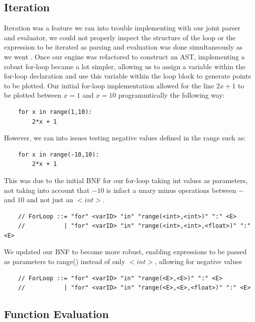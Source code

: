 \documentclass[a4paper, oneside, 11pt]{report}
\begin{document}
\subsection{Iteration}
Iteration was a feature we ran into trouble implementing with our joint parser and evaluator, we could not properly inspect the structure of the loop or the expression to be iterated as parsing and evaluation was done simultaneously as we went . Once our engine was refactored to construct an AST, implementing a robust for-loop became a lot simpler, allowing us to assign a variable within the for-loop declaration and use this variable within the loop block to generate points to be plotted. Our initial for-loop implementation allowed for the line $2x+1$ to be plotted between $x = 1$ and $x = 10$ programmtically the following way:

\begin{verbatim}
    for x in range(1,10):
        2*x + 1
\end{verbatim}

However, we ran into issues testing negative values defined in the range such as:

\begin{verbatim}
    for x in range(-10,10):
        2*x + 1
\end{verbatim}

This was due to the initial BNF for our for-loop taking int values as parameters, not taking into account that $-10$ is infact a unary minus operations between $-$ and $10$ and not just an $<int>$.

\begin{verbatim}
    // ForLoop ::= "for" <varID> "in" "range(<int>,<int>)" ":" <E>
    //           | "for" <varID> "in" "range(<int>,<int>,<float>)" ":" <E>
\end{verbatim}



We updated our BNF to become more robust, enabling expressions to be passed as parameters to range() instead of only $<int>$, allowing for negative values

\begin{verbatim}
    // ForLoop ::= "for" <varID> "in" "range(<E>,<E>)" ":" <E>
    //           | "for" <varID> "in" "range(<E>,<E>,<float>)" ":" <E>
\end{verbatim}

\subsection{Function Evaluation}
\end{document}
